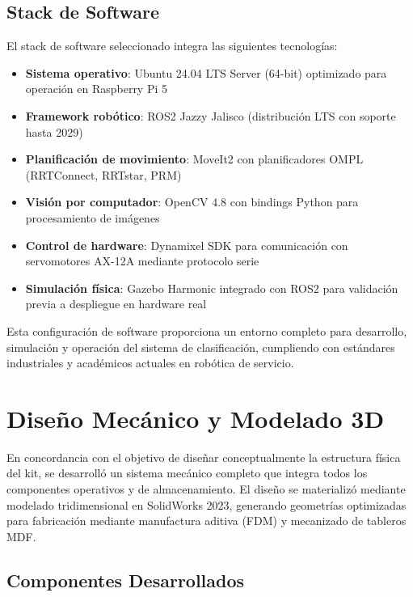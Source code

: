 \subsection{Stack de Software}

El stack de software seleccionado integra las siguientes tecnologías:

\begin{itemize}
    \item \textbf{Sistema operativo}: Ubuntu 24.04 LTS Server (64-bit) optimizado para operación en Raspberry Pi 5
    \item \textbf{Framework robótico}: ROS2 Jazzy Jalisco (distribución LTS con soporte hasta 2029)
    \item \textbf{Planificación de movimiento}: MoveIt2 con planificadores OMPL (RRTConnect, RRTstar, PRM)
    \item \textbf{Visión por computador}: OpenCV 4.8 con bindings Python para procesamiento de imágenes
    \item \textbf{Control de hardware}: Dynamixel SDK para comunicación con servomotores AX-12A mediante protocolo serie
    \item \textbf{Simulación física}: Gazebo Harmonic integrado con ROS2 para validación previa a despliegue en hardware real
\end{itemize}

Esta configuración de software proporciona un entorno completo para desarrollo, simulación y operación del sistema de clasificación, cumpliendo con estándares industriales y académicos actuales en robótica de servicio.

\section{Diseño Mecánico y Modelado 3D}

En concordancia con el objetivo de diseñar conceptualmente la estructura física del kit, se desarrolló un sistema mecánico completo que integra todos los componentes operativos y de almacenamiento. El diseño se materializó mediante modelado tridimensional en SolidWorks 2023, generando geometrías optimizadas para fabricación mediante manufactura aditiva (FDM) y mecanizado de tableros MDF.

\subsection{Componentes Desarrollados}

